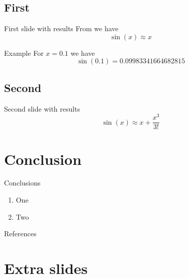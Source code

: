 \documentclass[
aspectratio=169,
16pt,
xcolor={dvipsnames} %
]{beamer}
\begin{document}
\subsection{First}
\begin{frame}[c]{First slide with results}
	From  we have
	\[
		\sin(x) \approx x
	\]
	\begin{block}{Example}
		For $x = 0.1$ we have 
		\[
			\sin (0.1) = 0.09983341664682815
		\]
	\end{block}
\end{frame}

\subsection{Second}
\begin{frame}[c]{Second slide with results}
	\[
	\sin(x) \approx x + \frac{x^3}{3!}
	\]
\end{frame}

\section{Conclusion}
\begin{frame}[c]{Conclusions}
	\begin{enumerate}
		\item One
		\item Two
	\end{enumerate}
\end{frame}


\begin{frame}[c]{References}
\printbibliography
\end{frame}


\section{Extra slides}
\end{document}
